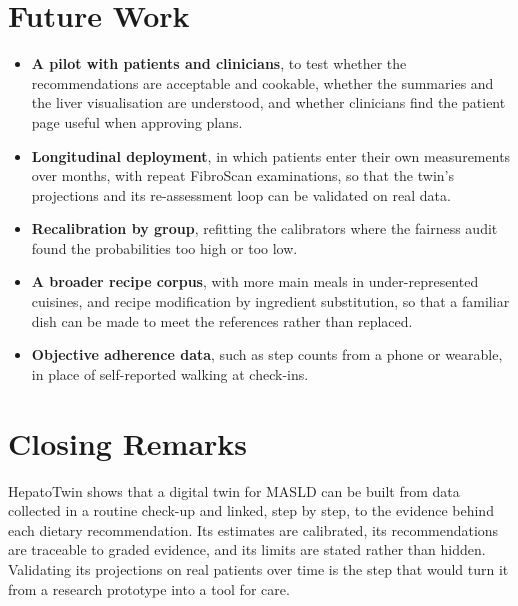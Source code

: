 \section{Future Work}
\label{sec:c_future}

\begin{itemize}
    \item \textbf{A pilot with patients and clinicians}, to test whether the
          recommendations are acceptable and cookable, whether the summaries
          and the liver visualisation are understood, and whether clinicians
          find the patient page useful when approving plans.
    \item \textbf{Longitudinal deployment}, in which patients enter their own
          measurements over months, with repeat FibroScan examinations, so that
          the twin's projections and its re-assessment loop can be validated on
          real data.
    \item \textbf{Recalibration by group}, refitting the calibrators where the
          fairness audit found the probabilities too high or too low.
    \item \textbf{A broader recipe corpus}, with more main meals in
          under-represented cuisines, and recipe modification by ingredient
          substitution, so that a familiar dish can be made to meet the
          references rather than replaced.
    \item \textbf{Objective adherence data}, such as step counts from a phone
          or wearable, in place of self-reported walking at check-ins.
\end{itemize}

\section{Closing Remarks}
\label{sec:c_closing}

HepatoTwin shows that a digital twin for MASLD can be built from data
collected in a routine check-up and linked, step by step, to the evidence
behind each dietary recommendation. Its estimates are calibrated, its
recommendations are traceable to graded evidence, and its limits are stated
rather than hidden. Validating its projections on real patients over time is
the step that would turn it from a research prototype into a tool for care.
